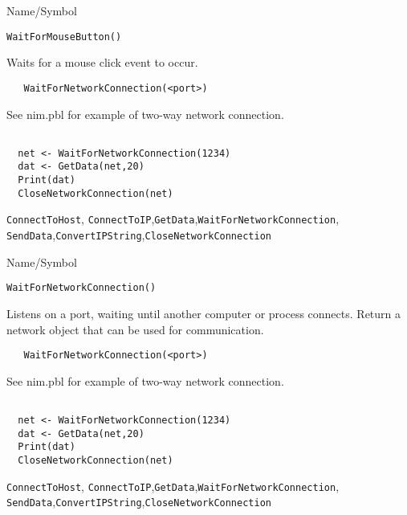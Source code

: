 \begin{desc}{Name/Symbol}
\item[Name/Symbol]	\verb+WaitForMouseButton()+

\item[Description] Waits for a mouse click event to occur.

\item[Usage]
\begin{verbatim}
   WaitForNetworkConnection(<port>)
\end{verbatim}

\item[Example]	

  See nim.pbl for example of two-way network connection.
\begin{verbatim}

  net <- WaitForNetworkConnection(1234)
  dat <- GetData(net,20)
  Print(dat)
  CloseNetworkConnection(net)
\end{verbatim}

\item[See Also]
  \verb+ConnectToHost+, \verb+ConnectToIP+,\verb+GetData+,\verb+WaitForNetworkConnection+,
   \verb+SendData+,\verb+ConvertIPString+,\verb+CloseNetworkConnection+
\end{desc}

\rl





\begin{desc}{Name/Symbol}
\item[Name/Symbol]	\verb+WaitForNetworkConnection()+

\item[Description]	Listens on a port, waiting until another computer or process
  connects. Return a network object that can be used for communication.

\item[Usage]
\begin{verbatim}
   WaitForNetworkConnection(<port>)
\end{verbatim}

\item[Example]	

  See nim.pbl for example of two-way network connection.
\begin{verbatim}

  net <- WaitForNetworkConnection(1234)
  dat <- GetData(net,20)
  Print(dat)
  CloseNetworkConnection(net)
\end{verbatim}

\item[See Also]
  \verb+ConnectToHost+, \verb+ConnectToIP+,\verb+GetData+,\verb+WaitForNetworkConnection+,
   \verb+SendData+,\verb+ConvertIPString+,\verb+CloseNetworkConnection+
\end{desc}

